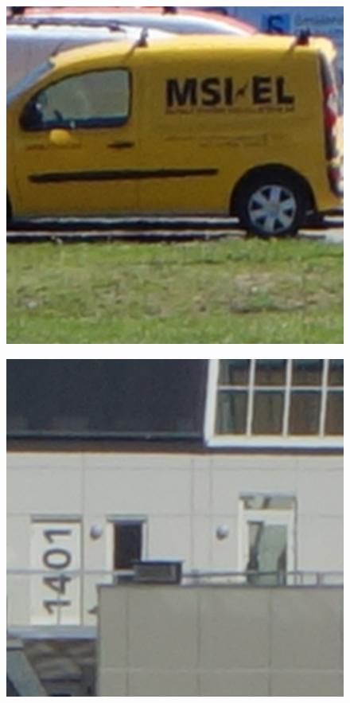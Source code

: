 \begin{figure}[H]
\begin{minipage}[t]{0.3\linewidth} %
	\includegraphics[width = 1\linewidth]{gfx/car/car_org.png}
	\label{fig:car_org}
\end{minipage}
\begin{minipage}[t]{0.3\linewidth} %
	\includegraphics[width = 1\linewidth]{gfx/hus/hus_org.png}

\end{minipage}
\end{figure}
